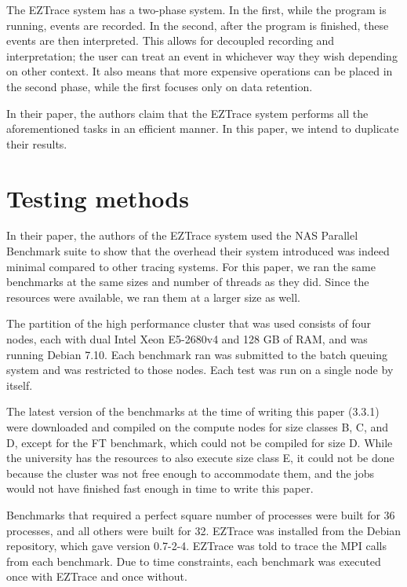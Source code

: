 \documentclass[12pt]{article}
\begin{document}
The EZTrace system has a two-phase system. In the first, while the program is running, events are recorded. In the second, 
after the program is finished, these events are then interpreted. This allows for decoupled recording and interpretation; 
the user can treat an event in whichever way they wish depending on other context. It also means that more expensive 
operations can be placed in the second phase, while the first focuses only on data retention. \cite{Trahay2011}

In their paper, the authors claim that the EZTrace system performs all the aforementioned tasks in an efficient manner. 
In this paper, we intend to duplicate their results.

\section{Testing methods}

In their paper, the authors of the EZTrace system used the NAS Parallel Benchmark suite \cite{Bailey1991} to show that the 
overhead their system introduced was indeed minimal compared to other tracing systems. For this paper, we ran the same 
benchmarks at the same sizes and number of threads as they did. Since the resources were available, we ran them at a 
larger size as well. \cite{Trahay2011}

The partition of the high performance cluster that was used consists of four nodes, each with dual Intel Xeon E5-2680v4 
and 128 GB of RAM, and was running Debian 7.10. Each benchmark ran was submitted to the batch queuing system and was 
restricted to those nodes. Each test was run on a single node by itself.

The latest version of the benchmarks at the time of writing this paper (3.3.1) were downloaded and compiled on the compute 
nodes for size classes B, C, and D, except for the FT benchmark, which could not be compiled for size D. While the university 
has the resources to also execute size class E, it could not be done because the cluster was not free enough to accommodate 
them, and the jobs would not have finished fast enough in time to write this paper.

Benchmarks that required a perfect square number of processes were built for 36 processes, and all others were built for 
32. EZTrace was installed from the Debian repository, which gave version 0.7-2-4. EZTrace was told to trace the MPI calls 
from each benchmark. Due to time constraints, each benchmark was executed once with EZTrace and once without.
\end{document}
